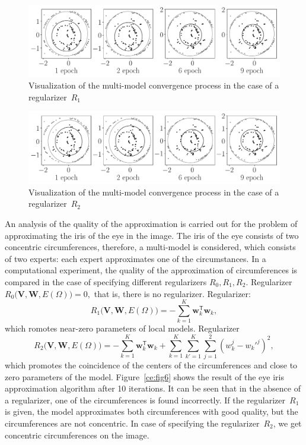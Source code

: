 \documentclass[12pt, twoside]{article}
\numberwithin{equation}{section}
\begin{document}
\begin{figure}
     \centering
     \includegraphics[width=\textwidth]{figures/experiment_real_prior}
     \caption{Visualization of the multi-model convergence process in the case of a regularizer~$R_1$}
    \label{ce:fig8}
\end{figure}

\begin{figure}
     \centering
     \includegraphics[width=\textwidth]{figures/experiment_real_regular}
     \caption{Visualization of the multi-model convergence process in the case of a regularizer~$R_2$}
    \label{ce:fig9}
\end{figure}

An analysis of the quality of the approximation is carried out for the problem of approximating the iris of the eye in the image. The iris of the eye consists of two concentric circumferences, therefore, a multi-model is considered, which consists of two experts: each expert approximates one of the circumstances. In a computational experiment, the quality of the approximation of circumferences is compared in the case of specifying different regularizers $R_0, R_1, R_2$. Regularizer$R_0\bigl(\mathbf{V}, \mathbf{W}, E(\Omega)\bigr)=0,$ that is, there is no regularizer. Regularizer:
\[
R_1\bigl(\mathbf{V}, \mathbf{W}, E(\Omega)\bigr)= -\sum_{k=1}^{K}\mathbf{w}_k^{\mathsf{T}}\mathbf{w}_k,
\]
which romotes near-zero parameters of local models.
Regularizer 
\[
R_2\bigl(\mathbf{V}, \mathbf{W}, E(\Omega)\bigr)= -\sum_{k=1}^{K}\mathbf{w}_k^{\mathsf{T}}\mathbf{w}_k + \sum_{k=1}^{K}\sum_{k'=1}^{K}\sum_{j=1}^2\left(w_k^j-w_k'^j\right)^2,\]
which promotes the coincidence of the centers of the circumferences and close to zero parameters of the model.
Figure~\ref{ce:fig6} shows the result of the eye iris approximation algorithm after 10 iterations. It can be seen that in the absence of a regularizer, one of the circumferences is found incorrectly. If the regularizer~$R_1 $ is given, the model approximates both circumferences with good quality, but the circumferences are not concentric. In case of specifying the regularizer~$R_2$, we get concentric circumferences on the image.
\end{document}
